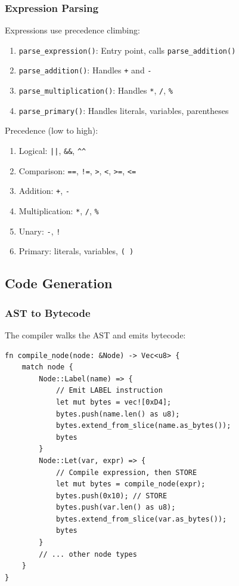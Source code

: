 \documentclass[11pt,a4paper]{article}
\begin{document}
\subsubsection{Expression Parsing}

Expressions use precedence climbing:

\begin{enumerate}
    \item \texttt{parse\_expression()}: Entry point, calls \texttt{parse\_addition()}
    \item \texttt{parse\_addition()}: Handles \texttt{+} and \texttt{-}
    \item \texttt{parse\_multiplication()}: Handles \texttt{*}, \texttt{/}, \texttt{\%}
    \item \texttt{parse\_primary()}: Handles literals, variables, parentheses
\end{enumerate}

Precedence (low to high):
\begin{enumerate}
    \item Logical: \texttt{||}, \texttt{\&\&}, \texttt{\textasciicircum\textasciicircum}
    \item Comparison: \texttt{==}, \texttt{!=}, \texttt{>}, \texttt{<}, \texttt{>=}, \texttt{<=}
    \item Addition: \texttt{+}, \texttt{-}
    \item Multiplication: \texttt{*}, \texttt{/}, \texttt{\%}
    \item Unary: \texttt{-}, \texttt{!}
    \item Primary: literals, variables, \texttt{( )}
\end{enumerate}

\subsection{Code Generation}

\subsubsection{AST to Bytecode}

The compiler walks the AST and emits bytecode:

\begin{lstlisting}[style=rustcode]
fn compile_node(node: &Node) -> Vec<u8> {
    match node {
        Node::Label(name) => {
            // Emit LABEL instruction
            let mut bytes = vec![0xD4];
            bytes.push(name.len() as u8);
            bytes.extend_from_slice(name.as_bytes());
            bytes
        }
        Node::Let(var, expr) => {
            // Compile expression, then STORE
            let mut bytes = compile_node(expr);
            bytes.push(0x10); // STORE
            bytes.push(var.len() as u8);
            bytes.extend_from_slice(var.as_bytes());
            bytes
        }
        // ... other node types
    }
}
\end{lstlisting}
\end{document}
